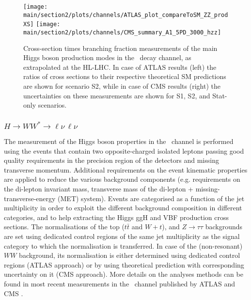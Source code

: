 \begin{figure}
  \centering
  \texttt{[image: \\main/section2/plots/channels/ATLAS\_plot\_compareToSM\_ZZ\_prodXS]}
  \texttt{[image: \\main/section2/plots/channels/CMS\_summary\_A1\_5PD\_3000\_hzz]}
  \caption{Cross-section times branching fraction measurements of the main Higgs boson production modes in the \HZZ\ decay channel, as extrapolated at the HL-LHC. In case of ATLAS results (left) the ratios of cross sections to their respective theoretical SM predictions are shown for scenario S2, while in case of CMS results (right) the uncertainties on these measurements are shown for S1, S2, and Stat-only scenarios.}
  \label{fig:HZZ_ATLAS_HLLHC_S2}
\end{figure}

\subsubsection{$H \to WW^* \to \ell\nu\,\ell\nu$}

The measurement of the Higgs boson properties in the \HWW\ channel is performed using the events that contain two opposite-charged isolated leptons passing good quality requirements in the precision region of the detectors and missing transverse momentum. Additional requirements on the event kinematic properties are applied to reduce the various background components (e.g. requirements on the di-lepton invariant mass, transverse mass of the di-lepton + missing-transverse-energy (MET) system). Events are categorised as a function of the jet multiplicity in order to exploit the different background composition in different categories, and to help extracting the Higgs ggH and VBF production cross sections. The normalisations of the top ($t\bar{t}$ and $W+t$), and $Z\rightarrow\tau\tau$ backgrounds are set using dedicated control regions of the same jet multiplicity as the signal category to which the normalisation is transferred. In case of the (non-resonant) $WW$ background, its normalisation is either determined using dedicated control regions (ATLAS approach) or by using theoretical prediction with corresponding uncertainty on it (CMS approach). More details on the analyses methods can be found in most recent measurements in the \HWW\ channel published by ATLAS \cite{Aaboud:2018jqu} and CMS \cite{Sirunyan:2018egh}.

